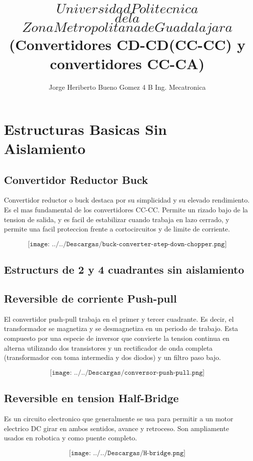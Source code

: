 \documentclass[12pt,a4paper]{report}
\author{Jorge Heriberto Bueno Gomez 
4 B Ing. Mecatronica}
\title{$$Universidad Politecnica   $$
$$de la$$
$$Zona Metropolitana de Guadalajara$$
(Convertidores CD-CD(CC-CC) y convertidores CC-CA)
}
\begin{document}
\maketitle

\section{Estructuras Basicas Sin Aislamiento} 
\subsection{Convertidor Reductor Buck}

Convertidor reductor o buck destaca por su simplicidad y su elevado rendimiento. Es el mas fundamental de los convertidores CC-CC. Permite un rizado bajo de la tension de salida, y es facil de estabilizar cuando trabaja en lazo cerrado, y permite una facil proteccion frente a cortocircuitos y de limite de corriente.

$$\texttt{[image: ../../Descargas/buck-converter-step-down-chopper.png]} $$

\subsection{Estructurs de 2 y 4 cuadrantes sin aislamiento}

\subsection{Reversible de corriente Push-pull}
El convertidor push-pull trabaja en el primer y tercer cuadrante. Es decir, el transformador se magnetiza y se desmagnetiza en un periodo de trabajo. Esta compuesto por una especie de inversor que convierte la tension continua en alterna utilizando dos transistores y un rectificador de onda completa (transformador con toma intermedia y dos diodos) y un filtro paso bajo.

$$\texttt{[image: ../../Descargas/conversor-push-pull.png]} $$

\subsection{Reversible en tension Half-Bridge}
Es un circuito electronico que generalmente se usa para permitir a un motor electrico DC girar en ambos sentidos, avance y retroceso. Son ampliamente usados en robotica y como puente completo.
 
$$\texttt{[image: ../../Descargas/H-bridge.png]} $$
\end{document}
